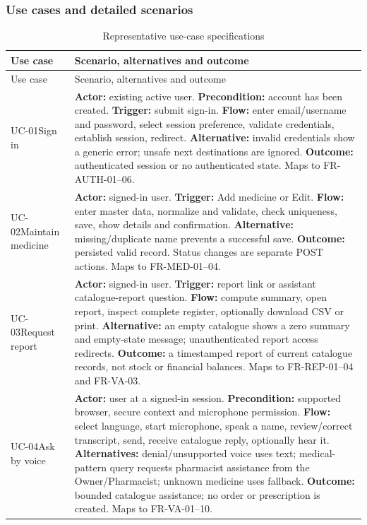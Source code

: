 \documentclass[11pt,a4paper]{article}
\begin{document}
\subsubsection{Use cases and detailed scenarios}
\begin{longtable}{L{26mm}L{121mm}}
\caption{Representative use-case specifications}\\
\toprule Use case & Scenario, alternatives and outcome\\\midrule\endfirsthead
\toprule Use case & Scenario, alternatives and outcome\\\midrule\endhead
\bottomrule\endfoot
UC-01\newline Sign in & \textbf{Actor:} existing active user. \textbf{Precondition:} account has been created. \textbf{Trigger:} submit sign-in. \textbf{Flow:} enter email/username and password, select session preference, validate credentials, establish session, redirect. \textbf{Alternative:} invalid credentials show a generic error; unsafe next destinations are ignored. \textbf{Outcome:} authenticated session or no authenticated state. Maps to FR-AUTH-01--06.\\
UC-02\newline Maintain medicine & \textbf{Actor:} signed-in user. \textbf{Trigger:} Add medicine or Edit. \textbf{Flow:} enter master data, normalize and validate, check uniqueness, save, show details and confirmation. \textbf{Alternative:} missing/duplicate name prevents a successful save. \textbf{Outcome:} persisted valid record. Status changes are separate POST actions. Maps to FR-MED-01--04.\\
UC-03\newline Request report & \textbf{Actor:} signed-in user. \textbf{Trigger:} report link or assistant catalogue-report question. \textbf{Flow:} compute summary, open report, inspect complete register, optionally download CSV or print. \textbf{Alternative:} an empty catalogue shows a zero summary and empty-state message; unauthenticated report access redirects. \textbf{Outcome:} a timestamped report of current catalogue records, not stock or financial balances. Maps to FR-REP-01--04 and FR-VA-03.\\
UC-04\newline Ask by voice & \textbf{Actor:} user at a signed-in session. \textbf{Precondition:} supported browser, secure context and microphone permission. \textbf{Flow:} select language, start microphone, speak a name, review/correct transcript, send, receive catalogue reply, optionally hear it. \textbf{Alternatives:} denial/unsupported voice uses text; medical-pattern query requests pharmacist assistance from the Owner/Pharmacist; unknown medicine uses fallback. \textbf{Outcome:} bounded catalogue assistance; no order or prescription is created. Maps to FR-VA-01--10.\\

\end{longtable}
\end{document}
